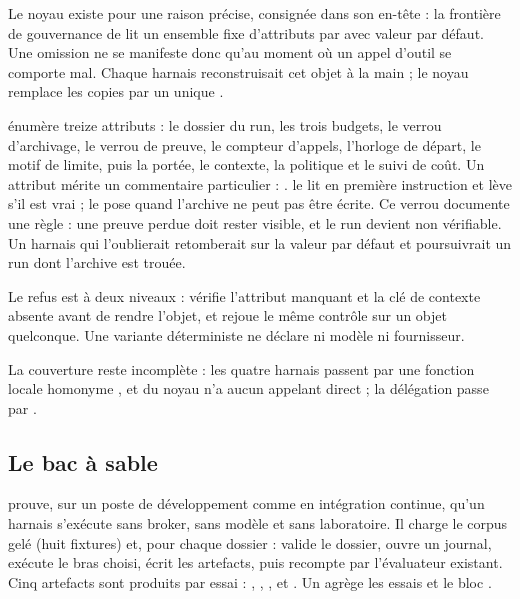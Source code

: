 Le noyau existe pour une raison précise, consignée dans son en-tête : la
frontière de gouvernance de  lit un ensemble
fixe d'attributs par  avec valeur par défaut. Une omission ne se
manifeste donc qu'au moment où un appel d'outil se comporte mal. Chaque harnais
reconstruisait cet objet à la main ; le noyau remplace les copies par un unique
.

 énumère treize attributs : le dossier du run, les
trois budgets, le verrou d'archivage, le verrou de preuve, le compteur d'appels,
l'horloge de départ, le motif de limite, puis la portée, le contexte, la
politique et le suivi de coût. Un attribut mérite un commentaire particulier :
.  le lit en
première instruction et lève  s'il est vrai ;
 le pose quand l'archive ne peut pas être écrite. Ce
verrou documente une règle : une preuve perdue doit rester visible, et le run
devient non vérifiable. Un harnais qui l'oublierait retomberait sur la valeur
par défaut et poursuivrait un run dont l'archive est trouée.

Le refus est à deux niveaux :  vérifie l'attribut manquant et
la clé de contexte absente avant de rendre l'objet, et
 rejoue le même contrôle sur un objet quelconque. Une
variante déterministe ne déclare ni modèle ni fournisseur.

La couverture reste incomplète : les quatre harnais  passent
par une fonction locale homonyme , et  du noyau
n'a aucun appelant direct ; la délégation passe par .

\subsection{Le bac à sable}

 prouve, sur un poste de développement
comme en intégration continue, qu'un harnais s'exécute sans broker, sans modèle
et sans laboratoire. Il charge le corpus gelé (huit fixtures) et, pour chaque
dossier : valide le dossier, ouvre un journal, exécute le bras choisi, écrit les
artefacts, puis recompte par l'évaluateur existant. Cinq artefacts sont produits
par essai : , , ,
 et . Un
 agrège les essais et le bloc .

